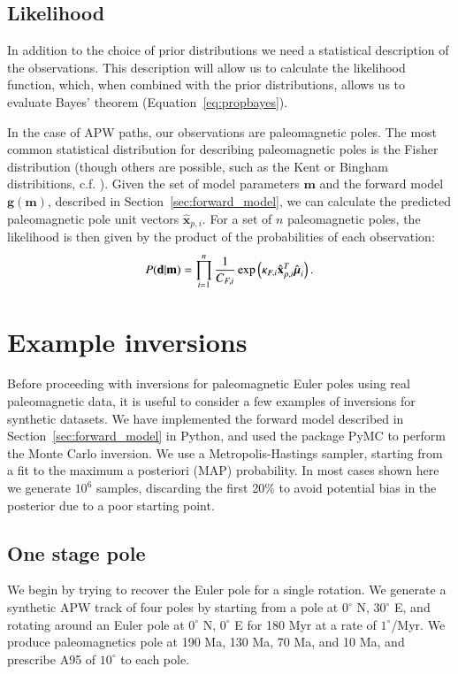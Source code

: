 \documentclass[preprint,12pt,authoryear]{elsarticle}
\newcommand{\mitbf}[1]{\hbox{\mathversion{bold}$#1$}}
\begin{document}
\subsection{Likelihood}
\label{sec:likelihood}
In addition to the choice of prior distributions we need a statistical description of the observations.
This description will allow us to calculate the likelihood function, which, when combined with the prior distributions,
allows us to evaluate Bayes' theorem (Equation~\eqref{eq:propbayes}).

In the case of APW paths, our observations are paleomagnetic poles.
The most common statistical distribution for describing paleomagnetic poles is the Fisher distribution
(though others are possible, such as the Kent or Bingham distribitions, c.f. \citet{tauxe2009essentials}).
Given the set of model parameters $\mathbf{m}$ and the forward model $\mathbf{g}(\mathbf{m})$, described
in Section~\ref{sec:forward_model}, we can calculate the predicted paleomagnetic pole unit vectors $\hat{\mathbf{x}}_{p,i}$.
For a set of $n$ paleomagnetic poles, the likelihood is then given by the product of the probabilities
of each observation:
\begin{equation}
P(\mathbf{d} \vert \mathbf{m}) = \displaystyle\prod_{i=1}^n \frac{1}{C_{F,i}} \exp \left( \kappa_{F,i} \hat{\mathbf{x}}_{p,i}^T \hat{\mitbf{\mu}}_i \right).
\label{eq:model_likelihood}
\end{equation}

\section{Example inversions}
\label{sec:example_inversion}

Before proceeding with inversions for paleomagnetic Euler poles using real paleomagnetic data,
it is useful to consider a few examples of inversions for synthetic datasets.
We have implemented the forward model described in Section~\ref{sec:forward_model}
in Python, and used the package PyMC \citep{patil2010pymc} to perform the Monte Carlo inversion.
We use a Metropolis-Hastings sampler, starting from a fit to the maximum a posteriori (MAP) probability.
In most cases shown here we generate $10^6$ samples, discarding the first 20\% to avoid
potential bias in the posterior due to a poor starting point.

\subsection{One stage pole}
\label{sec:one_stage_pole}
We begin by trying to recover the Euler pole for a single rotation.
We generate a synthetic APW track of four poles by starting from a pole at $0^\circ$ N, $30^\circ$ E,
and rotating around an Euler pole at $0^\circ$ N, $0^\circ$ E for 180 Myr at a rate of $1^\circ$/Myr.
We produce paleomagnetics pole at 190 Ma, 130 Ma, 70 Ma, and 10 Ma, and prescribe A95
of $10^\circ$ to each pole.
\end{document}
